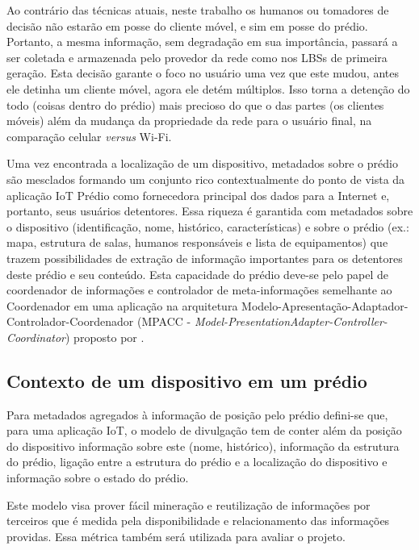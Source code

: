 Ao contrário das técnicas atuais, neste trabalho os humanos ou tomadores de
decisão não estarão em posse do cliente móvel, e sim em posse do prédio.
Portanto, a mesma informação, sem degradação em sua importância, passará a ser
coletada e armazenada pelo provedor da rede como nos LBSs de primeira geração.
Esta decisão garante o foco no usuário uma vez que este mudou, antes ele detinha
um cliente móvel, agora ele detém múltiplos. Isso torna a detenção do todo
(coisas dentro do prédio) mais precioso do que o das partes (os clientes móveis)
além da mudança da propriedade da rede para o usuário final, na comparação
celular \emph{versus} Wi-Fi.

Uma vez encontrada a localização de um dispositivo, metadados sobre o prédio são
mesclados formando um conjunto rico contextualmente do ponto de vista da
aplicação IoT Prédio como fornecedora principal dos dados para a Internet e,
portanto, seus usuários detentores. Essa riqueza é garantida com metadados sobre
o dispositivo (identificação, nome, histórico, características) e sobre o prédio
(ex.: mapa, estrutura de salas, humanos responsáveis e lista de equipamentos)
que trazem possibilidades de extração de informação importantes para os
detentores deste prédio e seu conteúdo. Esta capacidade do prédio deve-se pelo
papel de coordenador de informações e controlador de meta-informações semelhante
ao Coordenador em uma aplicação na arquitetura
Modelo-Apresentação-Adaptador-Controlador-Coordenador (MPACC -
\emph{Model-PresentationAdapter-Controller-Coordinator}) proposto por
.


\subsection{Contexto de um dispositivo em um prédio}
\label{subsec:Contexto de um dispositivo em um prédio}

Para metadados agregados à informação de posição pelo prédio defini-se que, para
uma aplicação IoT, o modelo de divulgação tem de conter além da posição do
dispositivo informação sobre este (nome, histórico), informação da estrutura do
prédio, ligação entre a estrutura do prédio e a localização do dispositivo e
informação sobre o estado do prédio.


Este modelo visa prover fácil mineração e reutilização de informações por
terceiros que é medida pela disponibilidade e
relacionamento das informações providas. Essa métrica também será utilizada para
avaliar o projeto.


